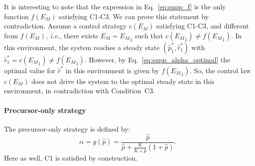 It is interesting to note that the expression in Eq.~\ref{eq:supp_f} is the only function $f(E_M)$ satisfying C1-C3.
We can prove this statement by contradiction.
Assume a control strategy $c(E_M)$ satisfying C1-C3, and different from $f(E_M)$, \textit{i.e.}, there exists $E_M={E_M}_1$ such that $c({E_M}_1) \neq f({E_M}_1)$.
In this environment, the system reaches a steady state $(\hat{p}_1^*, \hat{r}_1^*)$ with $\hat{r}_1^* = c({E_M}_1) \neq f({E_M}_1)$.
However, by Eq.~\ref{eq:supp_alpha_optimal} the optimal value for $\hat{r}^*$ in this environment is given by $f({E_M}_1)$.
So, the control law $c(E_M)$ does not drive the system to the optimal steady state in this environment, in contradiction with Condition~C3.

\paragraph{Precursor-only strategy}

The precursor-only strategy is defined by:
\begin{equation}
\label{eq:supp_g}
\alpha = g(\hat{p}) = \frac{\hat{p}}{\hat{p} + \frac{K}{K + \hat{p}}(1+\hat{p})}.
\end{equation}
Here as well, C1 is satisfied by construction.

